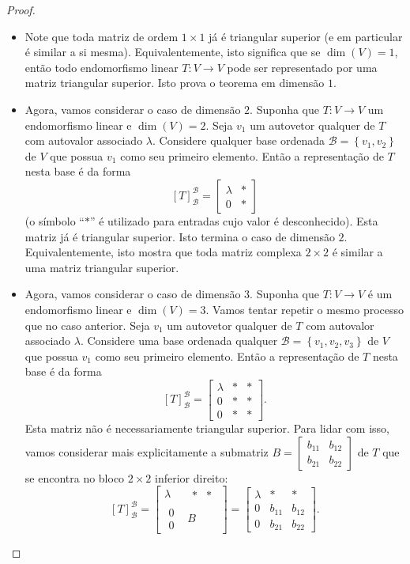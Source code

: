 \begin{proof}
	\begin{itemize}
	    \item Note que toda matriz de ordem $1\times 1$ já é triangular superior (e em particular é similar a si mesma). Equivalentemente, isto significa que se $\dim(V)=1$, então todo endomorfismo linear $T\colon V\to V$ pode ser representado por uma matriz triangular superior. Isto prova o teorema em dimensão $1$.
	
	    \item Agora, vamos considerar o caso de dimensão $2$. Suponha que $T\colon V\to V$ um endomorfismo linear e $\dim(V)=2$. Seja $v_1$ um autovetor qualquer de $T$ com autovalor associado $\lambda$. Considere qualquer base ordenada $\mathcal{B}=\left\{v_1,v_2\right\}$ de $V$ que possua $v_1$ como seu primeiro elemento. Então a representação de $T$ nesta base é da forma
	\[[T]_{\mathcal{B}}^{\mathcal{B}}=\begin{bmatrix}
	\lambda & \ast\\
	0 & \ast\end{bmatrix}\]
	(o símbolo ``$\ast$'' é utilizado para entradas cujo valor é desconhecido). Esta matriz já é triangular superior. Isto termina o caso de dimensão $2$. Equivalentemente, isto mostra que toda matriz complexa $2\times 2$ é similar a uma matriz triangular superior.
	
	    \item Agora, vamos considerar o caso de dimensão $3$. Suponha que $T\colon V\to V$ é um endomorfismo linear e $\dim(V)=3$. Vamos tentar repetir o mesmo processo que no caso anterior. Seja $v_1$ um autovetor qualquer de $T$ com autovalor associado $\lambda$. Considere uma base ordenada qualquer $\mathcal{B}=\left\{v_1,v_2,v_3\right\}$ de $V$ que possua $v_1$ como seu primeiro elemento. Então a representação de $T$ nesta base é da forma
	\[[T]_{\mathcal{B}}^{\mathcal{B}}=\begin{bmatrix}\lambda&\ast&\ast\\0&\ast&\ast\\0&\ast&\ast\end{bmatrix}.\]
	Esta matriz não é necessariamente triangular superior. Para lidar com isso, vamos considerar mais explicitamente a submatriz $B=\begin{bmatrix}b_{11}&b_{12}\\b_{21}&b_{22}\end{bmatrix}$ de $T$ que se encontra no bloco $2\times 2$ inferior direito:
	\[[T]_{\mathcal{B}}^{\mathcal{B}}=\begin{bmatrix}\lambda&\begin{matrix}\ast&\ast\end{matrix}\\\begin{matrix}0\\0\end{matrix}&B\end{bmatrix}=\begin{bmatrix}\lambda&\ast&\ast\\0&b_{11}&b_{12}\\0&b_{21}&b_{22}\end{bmatrix}.\]
	

\end{itemize}
\end{proof}
